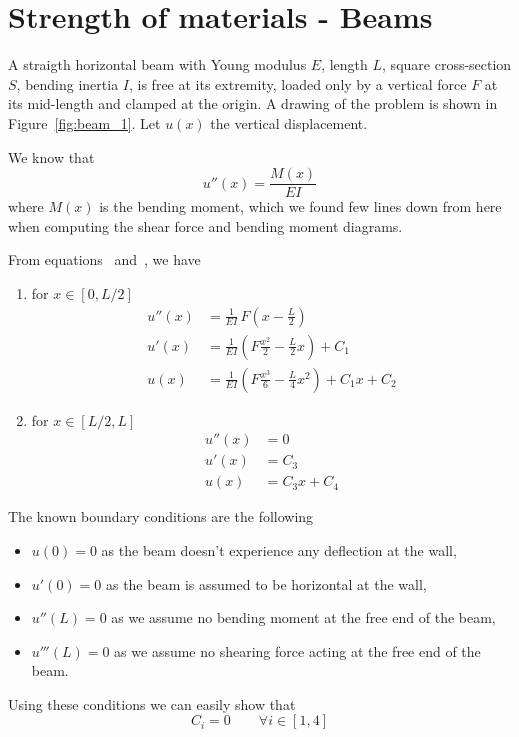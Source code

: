 \section{Strength of materials - Beams}
A straigth horizontal beam with Young modulus $E$, length $L$,
square cross-section $S$, bending inertia $I$,
is free at its extremity, loaded only by a vertical force $F$
at its mid-length and clamped at the origin.
A drawing of the problem is shown in Figure~\ref{fig:beam_1}.
Let $u(x)$ the vertical displacement.

We know that
\[ u''(x) = \frac{M(x)}{E I} \]
where $M(x)$ is the bending moment,
which we found few lines down from here
when computing the shear force and bending moment diagrams.

From equations~ and~,
we have
\begin{enumerate}
  \item for $x\in[0,L/2]$
  \begin{align*}
    u''(x) &= \frac{1}{E  I}\, F (x - \frac{L}{2}) \\
    u'(x) &= \frac{1}{E  I}\left(F\frac{x^2}{2} - \frac{L}{2} x \right)
    + C_1 \\
    u(x) &= \frac{1}{E  I}\left(F\frac{x^3}{6} - \frac{L}{4} x^2 \right)
    + C_1 x + C_2
  \end{align*}
  \item for $x\in[L/2,L]$
  \begin{align*}
    u''(x) &= 0 \\
    u'(x) &= C_3 \\
    u(x) &= C_3 x + C_4
  \end{align*}
\end{enumerate}

The known boundary conditions are the following
\begin{itemize}
\renewcommand\labelitemi{$\bullet$}
  \item $u(0) = 0$ as the beam doesn't experience
  any deflection at the wall,
  \item $u'(0) = 0$ as the beam is assumed 
  to be horizontal at the wall,
  \item $u''(L) = 0$ as we assume no bending moment
  at the free end of the beam,
  \item $u'''(L) = 0$ as we assume no shearing force
  acting at the free end of the beam.
\end{itemize}

Using these conditions we can easily show that
\[ C_i = 0 \qquad \forall i \in [1,4] \]

